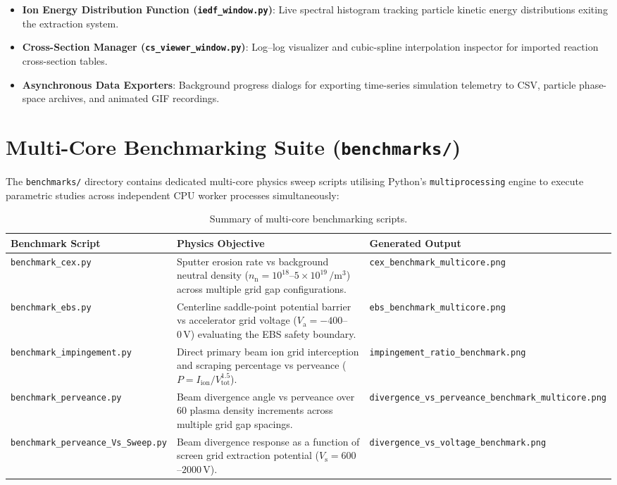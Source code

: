 \documentclass[11pt,a4paper]{article}
\begin{document}
\begin{itemize}[nosep]
    \item \textbf{Ion Energy Distribution Function (\texttt{iedf\_window.py})}: Live spectral histogram tracking particle kinetic energy distributions exiting the extraction system.
    \item \textbf{Cross-Section Manager (\texttt{cs\_viewer\_window.py})}: Log--log visualizer and cubic-spline interpolation inspector for imported reaction cross-section tables.
    \item \textbf{Asynchronous Data Exporters}: Background progress dialogs for exporting time-series simulation telemetry to CSV, particle phase-space archives, and animated GIF recordings.
\end{itemize}

\section{Multi-Core Benchmarking Suite (\texttt{benchmarks/})}

The \texttt{benchmarks/} directory contains dedicated multi-core physics sweep scripts utilising Python's \texttt{multiprocessing} engine to execute parametric studies across independent CPU worker processes simultaneously:

\begin{table}[h!]
\centering
\small
\begin{tabular}{lp{6cm}p{4.5cm}}
\toprule
\textbf{Benchmark Script} & \textbf{Physics Objective} & \textbf{Generated Output} \\
\midrule
\texttt{benchmark\_cex.py} & Sputter erosion rate vs background neutral density ($n_{\mathrm{n}} = 10^{18}$--$5\times 10^{19}\,\si{\per\meter\cubed}$) across multiple grid gap configurations. & \texttt{cex\_benchmark\_multicore.png} \\
\addlinespace
\texttt{benchmark\_ebs.py} & Centerline saddle-point potential barrier vs accelerator grid voltage ($V_{\mathrm{a}} = -400$--$0\,\si{\volt}$) evaluating the EBS safety boundary. & \texttt{ebs\_benchmark\_multicore.png} \\
\addlinespace
\texttt{benchmark\_impingement.py} & Direct primary beam ion grid interception and scraping percentage vs perveance ($P = I_{\mathrm{ion}} / V_{\mathrm{tot}}^{1.5}$). & \texttt{impingement\_ratio\_benchmark.png} \\
\addlinespace
\texttt{benchmark\_perveance.py} & Beam divergence angle vs perveance over 60 plasma density increments across multiple grid gap spacings. & \texttt{divergence\_vs\_perveance\_benchmark\_multicore.png} \\
\addlinespace
\texttt{benchmark\_perveance\_Vs\_Sweep.py} & Beam divergence response as a function of screen grid extraction potential ($V_{\mathrm{s}} = 600$--$2000\,\si{\volt}$). & \texttt{divergence\_vs\_voltage\_benchmark.png} \\
\bottomrule
\end{tabular}
\caption{Summary of multi-core benchmarking scripts.}
\end{table}
\end{document}

